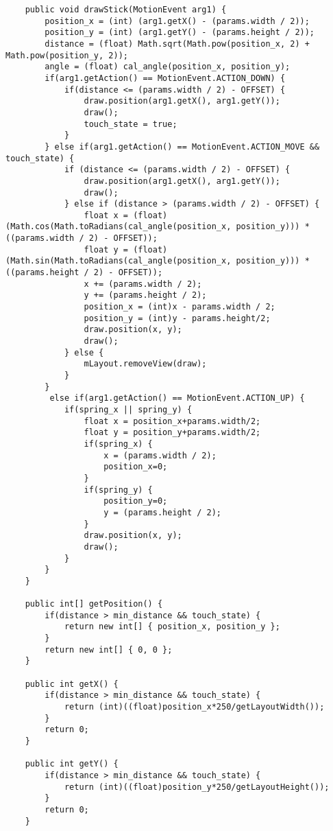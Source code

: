 \begin{lstlisting}
    public void drawStick(MotionEvent arg1) {
        position_x = (int) (arg1.getX() - (params.width / 2));
        position_y = (int) (arg1.getY() - (params.height / 2));
        distance = (float) Math.sqrt(Math.pow(position_x, 2) + Math.pow(position_y, 2));
        angle = (float) cal_angle(position_x, position_y);
        if(arg1.getAction() == MotionEvent.ACTION_DOWN) {
            if(distance <= (params.width / 2) - OFFSET) {
                draw.position(arg1.getX(), arg1.getY());
                draw();
                touch_state = true;
            }
        } else if(arg1.getAction() == MotionEvent.ACTION_MOVE && touch_state) {
            if (distance <= (params.width / 2) - OFFSET) {
                draw.position(arg1.getX(), arg1.getY());
                draw();
            } else if (distance > (params.width / 2) - OFFSET) {
                float x = (float) (Math.cos(Math.toRadians(cal_angle(position_x, position_y))) * ((params.width / 2) - OFFSET));
                float y = (float) (Math.sin(Math.toRadians(cal_angle(position_x, position_y))) * ((params.height / 2) - OFFSET));
                x += (params.width / 2);
                y += (params.height / 2);
                position_x = (int)x - params.width / 2;
                position_y = (int)y - params.height/2;
                draw.position(x, y);
                draw();
            } else {
                mLayout.removeView(draw);
            }
        }
         else if(arg1.getAction() == MotionEvent.ACTION_UP) {
            if(spring_x || spring_y) {
                float x = position_x+params.width/2;
                float y = position_y+params.width/2;
                if(spring_x) {
                    x = (params.width / 2);
                    position_x=0;
                }
                if(spring_y) {
                    position_y=0;
                    y = (params.height / 2);
                }
                draw.position(x, y);
                draw();
            }
        }
    }
    
    public int[] getPosition() {
        if(distance > min_distance && touch_state) {
            return new int[] { position_x, position_y };
        }
        return new int[] { 0, 0 };
    }
    
    public int getX() {
        if(distance > min_distance && touch_state) {
            return (int)((float)position_x*250/getLayoutWidth());
        }
        return 0;
    }
    
    public int getY() {
        if(distance > min_distance && touch_state) {
            return (int)((float)position_y*250/getLayoutHeight());
        }
        return 0;
    }
    

\end{lstlisting}
